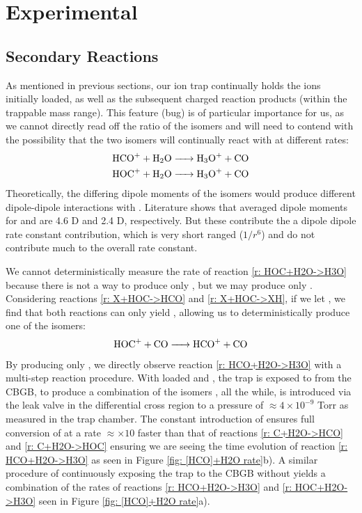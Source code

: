 \section{Experimental}

\subsection{Secondary Reactions}

As mentioned in previous sections, our ion trap continually holds the ions initially loaded, as well as the subsequent charged reaction products (within the trappable mass range). This feature (bug) is of particular importance for us, as we cannot directly read off the ratio of the isomers and will need to contend with the possibility that the two isomers will continually react with  at different rates:
\begin{align}
	\ce{HCO+ + H2O & -> H3O+ + CO} \label{r: HCO+H2O->H3O} \\
	\ce{HOC+ + H2O & -> H3O+ + CO} \label{r: HOC+H2O->H3O}
\end{align}
Theoretically, the differing dipole moments of the isomers would produce different dipole-dipole interactions with . Literature shows that averaged dipole moments for  and  are 4.6 D and 2.4 D, respectively.\cite{Rogers1982} But these contribute the a dipole dipole rate constant contribution, which is very short ranged ($1/r^6$) and do not contribute much to the overall rate constant.

We cannot deterministically measure the rate of reaction \ref{r: HOC+H2O->H3O} because there is not a way to produce only , but we may produce only . Considering reactions \ref{r: X+HOC->HCO} and \ref{r: X+HOC->XH}, if we let , we find that both reactions can only yield , allowing us to deterministically produce one of the isomers:
\begin{equation}
	\ce{HOC+ + CO -> HCO+ + CO} \label{r: HOC+CO->HCO}
\end{equation}
By producing only , we directly observe reaction \ref{r: HCO+H2O->H3O} with a multi-step reaction procedure. With loaded  and , the trap is exposed to  from the CBGB, to produce a combination of the isomers \ce{[HCO]+}, all the while,  is introduced via the leak valve in the differential cross region to a pressure of $\approx 4 \times 10^{-9}$ Torr as measured in the trap chamber. The constant introduction of  ensures full conversion of  at a rate $\approx \times 10$ faster than that of reactions \ref{r: C+H2O->HCO} and \ref{r: C+H2O->HOC} ensuring we are seeing the time evolution of reaction \ref{r: HCO+H2O->H3O} as seen in Figure \ref{fig: [HCO]+H2O rate}b). A similar procedure of continuously exposing the trap to the CBGB without  yields a combination of the rates of reactions \ref{r: HCO+H2O->H3O} and \ref{r: HOC+H2O->H3O} seen in Figure \ref{fig: [HCO]+H2O rate}a).

